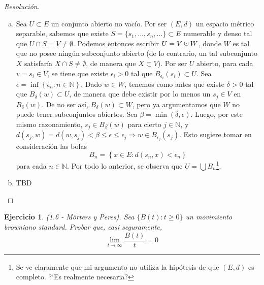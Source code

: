 \documentclass[a4paper,11pt]{article}
\newcommand{\cupdot}{\mathbin{\mathaccent\cdot\cup}}
\newcommand{\Bola}[2]{\ensuremath{B_{#2}(#1)}}
\newtheorem*{ej}{Ejercicio}
\begin{document}
\begin{proof}[Resoluci\'on]
$ $

\begin{enumerate}[a)]
    \item Sea $U \subset E$ un conjunto abierto no vacío. Por ser $(E,d)$ un
    espacio métrico separable, sabemos que existe
    $S = \{s_1,\dots,s_n,\dots\} \subset E$ numerable y denso tal que
    $U \cap S = V \neq \emptyset$. Podemos entonces escribir $U = V \cupdot W$,
    donde $W$ es tal que no posee ningún subconjunto abierto (de lo
    contrario, un tal subconjunto $X$ satisfaría $X \cap S \neq \emptyset$,
    de manera que $X \subset V$). Por ser $U$ abierto, para cada $v = s_i
    \in V$, se tiene que existe $\epsilon_i > 0$ tal que
    $\Bola{s_i}{\epsilon_i} \subset U$. Sea
    $\epsilon = \inf \left\{ \epsilon_n : n \in \mathbb{N} \right\}$.
    Dado $w \in W$, tenemos como antes que existe $\delta > 0$ tal que
    $\Bola{w}{\delta} \subset U$, de manera que debe existir por lo menos
    un $s_j \in V$ en $\Bola{w}{\delta}$. De no ser así,
    $\Bola{w}{\delta} \subset W$, pero ya argumentamos que $W$ no puede
    tener subconjuntos abiertos. Sea $\beta = \min(\delta, \epsilon)$.
    Luego, por este mismo razonamiento, $s_j \in \Bola{w}{\beta}$ para
    cierto $j \in \mathbb{N}$, y
    $d(s_j,w) = d(w,s_j) < \beta \leq \epsilon \leq \epsilon_j \Rightarrow 
    w \in \Bola{s_j}{\epsilon_j}$. Esto sugiere tomar en consideración las
    bolas
    $$B_n = \left\{ x \in E : d(s_n, x) < \epsilon_n \right\}$$
    para cada $n \in \mathbb{N}$. Por todo lo anterior, se observa que
    $U = \bigcup B_n$\footnote{Se ve claramente que mi argumento no utiliza
    la hipótesis de que $(E,d)$ es completo. ?`Es realmente necesaria?}.

    \item TBD
\end{enumerate}

\end{proof}


\begin{ej}
    (1.6 - Mörters y Peres). Sea $\{B(t) : t \geq 0\}$ un movimiento browniano
    standard. Probar que, casi seguramente,
    $$\lim_{t \to \infty}{\frac{B(t)}{t}} = 0$$ 
\end{ej}
\end{document}
